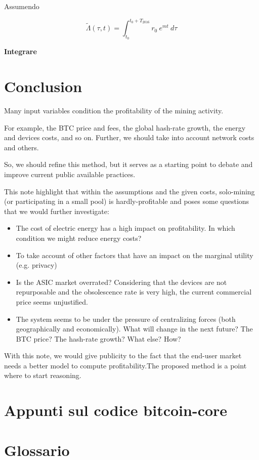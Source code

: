 \documentclass{article}
\begin{document}
Assumendo

\begin{equation}
    \tilde{\Lambda}(\tau, t) = \int_{t_{0}}^{t_{0} + T_{2016}} r_{0} \ e^{m t} \ d\tau
\end{equation}

\textbf{Integrare}

\newpage

\section{Conclusion}

Many input variables condition the profitability of the mining activity.

For example, the BTC price and fees, the global hash-rate growth, the energy and devices costs, and so on. Further, we should take into account network costs and others.

So, we should refine this method, but it serves as a starting point to debate and improve current public available practices.

This note highlight that within the assumptions and the given costs, solo-mining (or participating in a small pool) is hardly-profitable and poses some questions that we would further investigate:


\begin{itemize}
    \item The cost of electric energy has a high impact on profitability. In which condition we might reduce energy costs?
    \item To take account of other factors that have an impact on the marginal utility (e.g. privacy)
    \item Is the ASIC market overrated? Considering that the devices are not repurposable and the obsolescence rate is very high, the current commercial price seems unjustified.
    \item The system seems to be under the pressure of centralizing forces (both geographically and economically). What will change in the next future? The BTC price? The hash-rate growth? What else? How?
\end{itemize}

With this note, we would give publicity to the fact that the end-user market needs a better model to compute profitability.The proposed method is a point where to start reasoning.

\newpage
\appendix

\newpage
\section{Appunti sul codice bitcoin-core}

\newpage
\section{Glossario}

\newpage


\end{document}
